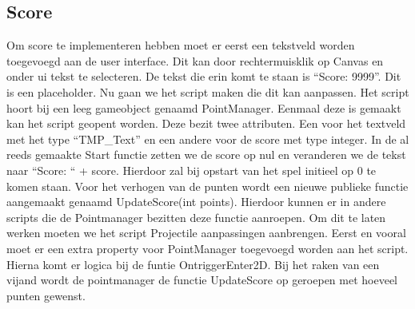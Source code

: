 \subsection{Score}
Om score te implementeren hebben moet er eerst een tekstveld worden toegevoegd aan de user interface. Dit kan door rechtermuisklik op Canvas en onder ui tekst te selecteren. De tekst die erin komt te staan is “Score: 9999”. Dit is een placeholder. Nu gaan we het script maken die dit kan aanpassen. Het script hoort bij een leeg gameobject genaamd PointManager. Eenmaal deze is gemaakt kan het script geopent worden. Deze bezit twee attributen. Een voor het textveld met het type  “TMP_Text” en een andere voor de score met type integer. In de al reeds gemaakte Start functie zetten we de score op nul en veranderen we de tekst naar “Score: “ + score. Hierdoor zal bij opstart van het spel initieel op 0 te komen staan. Voor het verhogen van de punten wordt een nieuwe publieke functie aangemaakt genaamd UpdateScore(int points). Hierdoor kunnen er in andere scripts die de Pointmanager bezitten deze functie aanroepen. Om dit te laten werken moeten we het script Projectile aanpassingen aanbrengen. Eerst en vooral moet er een extra property voor PointManager toegevoegd worden aan het script. Hierna komt er logica bij de funtie OntriggerEnter2D. Bij het raken van een vijand wordt de pointmanager de functie UpdateScore op geroepen met hoeveel punten gewenst.

